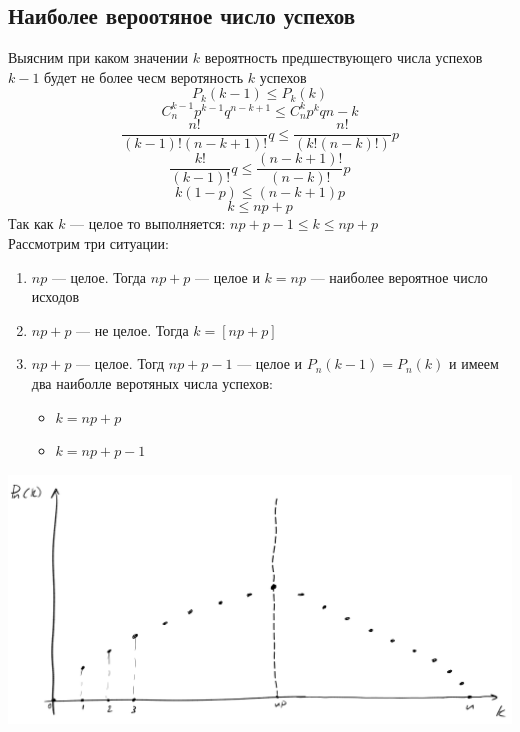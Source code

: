 \documentclass[oneside]{book}
\theoremstyle{plain}
\theoremstyle{remark}
\theoremstyle{definition}
\begin{document}
\subsection{Наиболее вероотяное число успехов}
\label{sec:org91cbd51}
Выясним при каком значении \(k\) вероятность предшествующего числа
успехов \(k - 1\) будет не более чесм веротяность \(k\) успехов
\[ P_k(k - 1) \le P_k(k) \]
\[ C^{k-1}_np^{k - 1}q^{n - k + 1} \le C^k_np^kq{n - k} \]
\[ \frac{n!}{(k - 1)!(n -k + 1)!}q \le \frac{n!}{(k!(n - k)!)}p \]
\[ \frac{k!}{(k-1)!}q \le \frac{(n - k + 1)!}{(n - k)!}p \]
\[ k(1- p) \le (n - k + 1)p \]
\[ k \le np + p \]
Так как \(k\) --- целое то выполняется: \(np + p - 1\le k \le np + p\) \\
Рассмотрим три ситуации:
\begin{enumerate}
\item \(np\) --- целое. Тогда \(np + p\) --- целое и \(k = np\) --- наиболее вероятное число исходов
\item \(np + p\) --- не целое. Тогда \(k = [np + p]\)
\item \(np + p\) --- целое. Тогд \(np + p - 1\) --- целое и \(P_n(k - 1)
   = P_n(k)\) и имеем два наиболле веротяных числа успехов:
\begin{itemize}
\item \(k = np + p\)
\item \(k = np + p - 1\)
\end{itemize}
\end{enumerate}
\begin{center}
\includegraphics[scale=0.35]{4_1.png}
\end{center}
\end{document}

